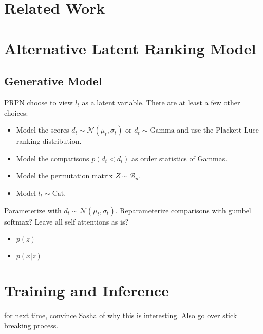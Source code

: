 \documentclass{article}
\begin{document}
\section{Related Work}

\section{Alternative Latent Ranking Model}
\subsection{Generative Model}
PRPN \citep{shen2018prpn} choose to view $l_t$ as a latent variable.
There are at least a few other choices:
\begin{itemize}
\item Model the scores $d_t \sim \mathcal{N}(\mu_t,\sigma_t)$
or $d_t \sim \textrm{Gamma}$
and use the Plackett-Luce ranking distribution.
\item Model the comparisons $p(d_t < d_i)$ as order statistics of Gammas.
\item Model the permutation matrix $Z \sim \mathcal{B}_n$.
\item Model $l_t\sim \textrm{Cat}$.
\end{itemize}
Parameterize with $d_t\sim\mathcal{N}(\mu_t, \sigma_t)$.
Reparameterize comparisons with gumbel softmax?
Leave all self attentions as is?
\begin{itemize}
\item $p(z)$
\item $p(x|z)$
\end{itemize}

\section{Training and Inference}

for next time, convince Sasha of why this is interesting.
Also go over stick breaking process.



\end{document}
